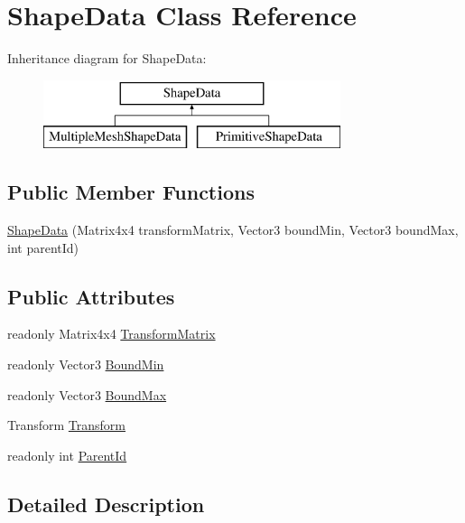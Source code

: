 \hypertarget{class_shape_data}{}\section{Shape\+Data Class Reference}
\label{class_shape_data}
Inheritance diagram for Shape\+Data\+:\begin{figure}[H]
\begin{center}
\leavevmode
\includegraphics[height=2.000000cm]{class_shape_data}
\end{center}
\end{figure}
\subsection*{Public Member Functions}
\begin{DoxyCompactItemize}
\item 
\mbox{\hyperlink{class_shape_data_ac267d3675f6750a85431b55b87fc677c}{Shape\+Data}} (Matrix4x4 transform\+Matrix, Vector3 bound\+Min, Vector3 bound\+Max, int parent\+Id)
\end{DoxyCompactItemize}
\subsection*{Public Attributes}
\begin{DoxyCompactItemize}
\item 
readonly Matrix4x4 \mbox{\hyperlink{class_shape_data_a604384bb9311f5a3e6eaaa8ac3965919}{Transform\+Matrix}}
\item 
readonly Vector3 \mbox{\hyperlink{class_shape_data_a3852657f21bb30029363cb63257299b6}{Bound\+Min}}
\item 
readonly Vector3 \mbox{\hyperlink{class_shape_data_ad57256c9447776d39f2d65b248ad92dc}{Bound\+Max}}
\item 
Transform \mbox{\hyperlink{class_shape_data_ac6bdbf9124190bfcd1d32cfb0df712ee}{Transform}}
\item 
readonly int \mbox{\hyperlink{class_shape_data_ad47d3c37921e5c201d948387f79d81e7}{Parent\+Id}}
\end{DoxyCompactItemize}


\subsection{Detailed Description}


